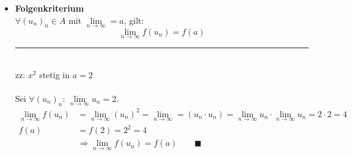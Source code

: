 \documentclass{article}
\newcommand{\commentmath}[1]{{\color{gruen}{#1}}}
\begin{document}
\begin{itemize}
\begin{minipage}{\textwidth}
{\color{blue}
\hrule
	\\
	zz: $\lim\limits_{x\rightarrow\infty} \frac{x^2}{x + 1} = \infty$\\
	\\
	Zeige $\forall\varepsilon > 0\ \exists x_0 > 0 \text{ s.d. } \forall x\in\mathbb{R}\ x\geq x_0: \frac{x^2}{x + 1} > M$
		$$\frac{x^2}{x + 1} \stackrel{\commentmath{x\geq x_0\geq 1}}{\geq} \frac{x^2}{x + x} = \frac{x^2}{2x} = \frac{x}{2} \geq \frac{x_0}{2} \stackrel{!}{>} M \quad\Rightarrow\quad x_0 > 2M$$
	Sei $\varepsilon > 0$. Wähle $x_0 = \max(1, 2M)$. $\forall x\in\mathbb{R}$ mit $x\geq x_0$ gilt:
		$$\frac{x^2}{x + 1} \stackrel{\commentmath{x\geq x_0\geq 1}}{\geq} \frac{x^2}{x + x} = \frac{x^2}{2x} = \frac{x}{2} \geq \frac{x_0}{2} \geq \frac{2M}{2} = M \qquad\blacksquare$$
\hrule
}
\end{minipage}

{\color{gruen}
- Um z.B. $|x + 2|$ abzuschätzen, wähle $\delta$ kleiner einer Zahl (typisch: 1) und stelle die Ungl. um.\\
	$$|x - 2| \leq \delta \leq 1 \quad\Rightarrow\quad -1 \leq x - 2 \leq 1 \quad\Rightarrow\quad 3 \leq x + 2 \leq 5 \quad\Rightarrow\quad |x + 2| \leq 5$$

Schreibe dann $\delta = \min\{1, ...\}$ wobei $...$ eine weitere Bedingung für $\delta$ ist, die i.d.R. später gefunden wird.\\
- Für z.B. $x\rightarrow 1^+$ folgt die Bedingung $x>1$, da es sich von rechts annähert.\\
- Für mehrere Abschätzungen z.B. $x_0 \geq 1,\ x_0 \geq ...$, schreibe $x_0 = \max(1,...)$}


	\item \textbf{Folgenkriterium}\\
	$\forall (u_n)_n \in A$ mit $\lim\limits_{n\rightarrow \infty} = a$, gilt:
		\begin{equation}
			\lim\limits_{n\rightarrow \infty} f(u_n) = f(a)
		\end{equation}
	
	\begin{minipage}{\textwidth}
	{\color{blue}
	\hrule
		\\
		zz: $x^2$ stetig in $a=2$\\
		\\
		Sei $\forall(u_n)_n$: $\lim\limits_{n\rightarrow \infty}u_n = 2$.
		\begin{align*}			
			\lim\limits_{n\rightarrow \infty} f(u_n) &= \lim\limits_{n\rightarrow \infty} (u_n)^2 = \lim\limits_{n\rightarrow \infty} = (u_n \cdot u_n) = \lim\limits_{n\rightarrow \infty} u_n \cdot \lim\limits_{n\rightarrow \infty} u_n = 2 \cdot 2 = 4\\
			f(a) &= f(2) = 2^2 = 4\\
			&\Rightarrow \lim\limits_{n\rightarrow \infty} f(u_n) = f(a) \qquad\blacksquare
		\end{align*}


}
\end{minipage}
\end{itemize}
\end{document}
